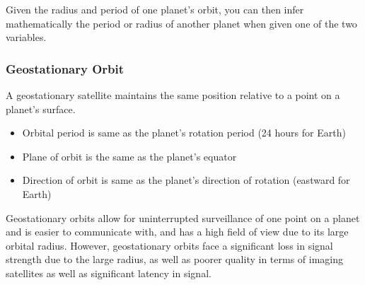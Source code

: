 \documentclass[../main]{subfiles}
\begin{document}

	Given the radius and period of one planet's orbit, you can then infer mathematically the period or radius of another planet when given one of the two variables.

	\subsubsection{Geostationary Orbit}

	A geostationary satellite maintains the same position relative to a point on a planet's surface.

	\begin{itemize}
		\item Orbital period is same as the planet's rotation period (24 hours for Earth)
		\item Plane of orbit is the same as the planet's equator
		\item Direction of orbit is same as the planet's direction of rotation (eastward for Earth)
	\end{itemize}

	Geostationary orbits allow for uninterrupted surveillance of one point on a planet and is easier to communicate with, and has a high field of view due to its large orbital radius. However, geostationary orbits face a significant loss in signal strength due to the large radius, as well as poorer quality in terms of imaging satellites as well as significant latency in signal.
\end{document}

